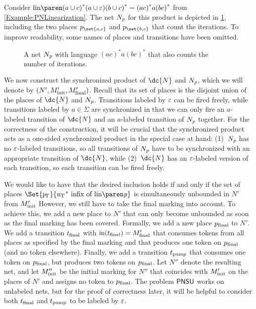 \documentclass[../../diss.tex]{subfiles}
\begin{document}
\begin{example}%
\label{Example:PNLinearizationNet}%
    Consider $\linof{ {(a\cup c)}^*(a\cup\varepsilon){(b\cup c)}^* } = {(ac)}^*a{(bc)}^*$ from \cref{Example:PNLinearization}.
    The net $N_{\mathit{p}}$ for this product is depicted in \cref{Figure:PNLinearizationNet}, including the two places $p_{\set{a,c}}$ and $p_{\set{b,c}}$ that count the iterations.
    To improve readability, some names of places and transitions have been omitted.
\end{example}

\begin{figure}[t]
    \centering%
    \caption{A net $N_{\mathit{p}}$ with language ${(ac)}^*a{(bc)}^*$ that also counts the number of iterations.}%
    \label{Figure:PNLinearizationNet}%
\end{figure}

We now construct the synchronized product of $\mathmbox{\dc{N}}$ and $N_{\mathit{p}}$, which we will denote by $(N',M_{\text{init}}',M_{\text{final}}')$.
Recall that its set of places is the disjoint union of the places of $\dc{N}$ and $N_{\mathit{p}}$.
Transitions labeled by $\varepsilon$ can be fired freely, while transitions labeled by $a \in \Sigma$ are synchronized in that we can only fire an $a$-labeled transition of $\dc{N}$ and an $a$-labeled transition of $N_{\mathit{p}}$ together.
For the correctness of the construction, it will be crucial that the synchronized product acts as a one-sided synchronized product in the special case at hand:
(1)~$N_{\mathit{p}}$ has no $\varepsilon$-labeled transitions, so all transitions of $N_{\mathit{p}}$ have to be synchronized with an appropriate transition of $\dc{N}$, while
(2)~$\dc{N}$ has an $\varepsilon$-labeled version of each transition, so each transition can be fired freely.

We would like to have that the desired inclusion holds if and only if the set of places $\Set{ p_{\Gamma}}{ {w_{\Gamma}}^* \text{ infix of } \linof{\product}}$ is simultaneously unbounded in $N'$ from $M_{\text{init}}'$
However, we still have to take the final marking into account.
To achieve this, we add a new place to $N'$ that can only become unbounded as soon as the final marking has been covered.
Formally, we add a new place $p_{\text{final}}$ to $N'$.
We add a transition $t_{\text{final}}$ with $\text{in}(t_{\text{final}}) = M_{\text{final}}'$ that consumes tokens from all places as specified by the final marking and that produces one token on $p_{\text{final}}$ (and no token elsewhere).
Finally, we add a transition $t_{\text{pump}}$ that consumes one token on $p_{\text{final}}$, but produces two tokens on $p_{\text{final}}$.
Let $N''$ denote the resulting net, and let $M_{\text{init}}''$ be the initial marking for $N''$ that coincides with $M_{\text{init}}'$ on the places of $N'$ and assigns no token to $p_{\text{final}}$.
The problem $\mathsf{PNSU}$ works on unlabeled nets, but for the proof of correctness later, it will be helpful to consider both $t_{\text{final}}$ and $t_{\text{pump}}$ to be labeled by $\varepsilon$.
\end{document}
